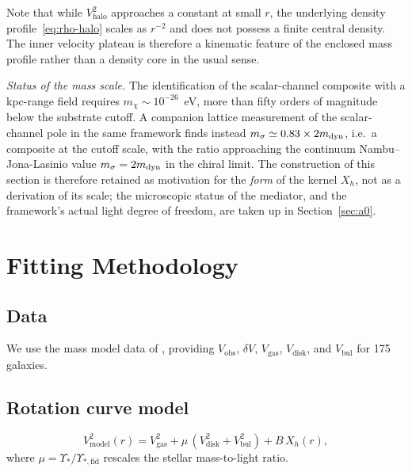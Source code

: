 \documentclass[11pt,a4paper]{article}
\begin{document}
Note that while $V_{\mathrm{halo}}^2$ approaches a constant at
small $r$, the underlying density profile~\eqref{eq:rho-halo}
scales as $r^{-2}$ and does not possess a finite central density.
The inner velocity plateau is therefore a kinematic feature of the
enclosed mass profile rather than a density core in the usual sense.

\emph{Status of the mass scale.}  The identification of the
scalar-channel composite with a kpc-range field requires
$m_\chi \sim 10^{-26}$~eV, more than fifty orders of magnitude below the
substrate cutoff.  A companion lattice measurement of the
scalar-channel pole in the same framework finds instead
$m_\sigma \simeq 0.83 \times 2m_{\rm dyn}$, i.e.\ a composite at the
cutoff scale, with the ratio approaching the continuum
Nambu--Jona-Lasinio value $m_\sigma = 2m_{\rm dyn}$ in the chiral
limit.  The construction of this section is therefore retained as
motivation for the \emph{form} of the kernel $X_h$, not as a derivation
of its scale; the microscopic status of the mediator, and the
framework's actual light degree of freedom, are taken up in
Section~\ref{sec:a0}.


\section{Fitting Methodology}
\label{sec:method}

\subsection{Data}

We use the mass model data of \cite{Lelli:2016zqa}, providing
$V_{\mathrm{obs}}$, $\delta V$, $V_{\mathrm{gas}}$,
$V_{\mathrm{disk}}$, and $V_{\mathrm{bul}}$ for 175 galaxies.

\subsection{Rotation curve model}

\begin{equation}
V_{\mathrm{model}}^2(r) = V_{\mathrm{gas}}^2
+ \mu\,(V_{\mathrm{disk}}^2 + V_{\mathrm{bul}}^2)
+ B\,X_h(r),
\label{eq:Vmodel}
\end{equation}
where $\mu = \Upsilon_*/\Upsilon_{*,\mathrm{fid}}$ rescales the
stellar mass-to-light ratio.
\end{document}
